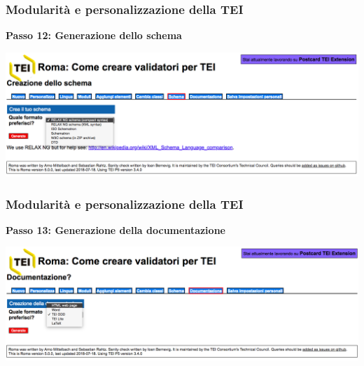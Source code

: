 \begin{frame}
    \frametitle{Modularità e personalizzazione della TEI}
    \addtocounter{nframe}{1}
   
   
    \textbf{Passo 12: Generazione dello schema}

     \begin{center}
        \includegraphics[width=.9\textwidth]{imgs/Roma12.png}
     \end{center}
   
    
\end{frame}

\begin{frame}
    \frametitle{Modularità e personalizzazione della TEI}
    \addtocounter{nframe}{1}
    
    \textbf{Passo 13: Generazione della documentazione}

     \begin{center}
        \includegraphics[width=.95\textwidth]{imgs/Roma13.png}
     \end{center}
    
\end{frame}

